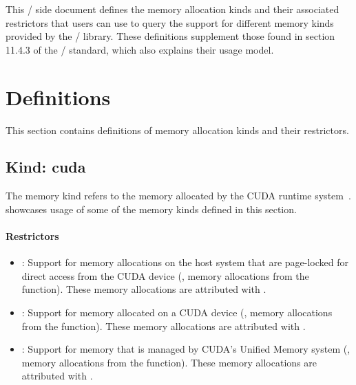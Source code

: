 This \mpi/ side document defines the memory allocation kinds and their
associated restrictors that users can use to query the support for
different memory kinds provided by the \mpi/ library. These definitions
supplement those found in section 11.4.3 of the \mpi/ standard, which
also explains their usage model.

\chapter{Definitions}
\label{chap:definitions}

This section contains definitions of memory allocation kinds and
their restrictors.

\section{Kind: cuda}

The  memory kind refers to the memory allocated by the
CUDA runtime system~\cite{cudaref}. 
showcases usage of some of the memory kinds defined in this section. 

\subsubsection{Restrictors}

\begin{itemize}

\item {}: Support for memory allocations on the host system
    that are page-locked for direct access from the CUDA device (\eg,
        memory allocations from the  function).
        These memory allocations are attributed with .

\item {}: Support for memory allocated on a CUDA device
    (\eg, memory allocations from the  function).
        These memory allocations are attributed with .

\item {}: Support for memory that is managed by CUDA’s
    Unified Memory system (\eg, memory allocations from the
         function).
        These memory allocations are attributed with .

\end{itemize}

